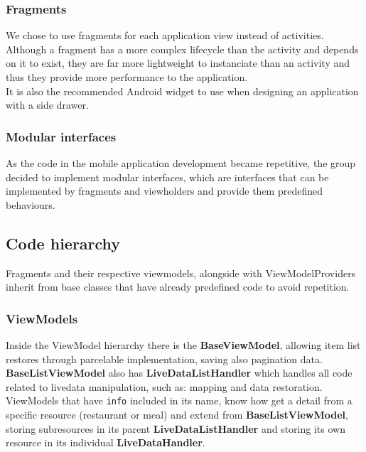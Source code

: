 \subsubsection{Fragments}

We chose to use fragments\cite{fragment} for each application view instead of activities. Although a fragment has a more complex lifecycle than the activity and depends on it
to exist, they are far more lightweight to instanciate than an activity and thus they provide more performance to the application.\\ 

It is also the recommended Android widget to use when designing an application with a side drawer.\\


\subsubsection{Modular interfaces}

As the code in the mobile application development became repetitive, the group decided to implement modular interfaces,
which are interfaces that can be implemented by fragments and viewholders and provide them predefined behaviours.

\subsection{Code hierarchy}

Fragments and their respective viewmodels, alongside with ViewModelProviders inherit from base classes that have already predefined code to avoid repetition.\\

\subsubsection{ViewModels}

Inside the ViewModel hierarchy there is the \textbf{BaseViewModel}, allowing item list restores through parcelable implementation, saving also pagination data.\\

\textbf{BaseListViewModel} also has \textbf{LiveDataListHandler} which handles all code related to livedata manipulation, such as: mapping and data restoration.\\

ViewModels that have \texttt{info} included in its name, know how get a detail from a specific resource (restaurant or meal)
and extend from \textbf{BaseListViewModel},
storing subresources in its parent \textbf{LiveDataListHandler} and storing its own resource in its individual \textbf{LiveDataHandler}.\\

